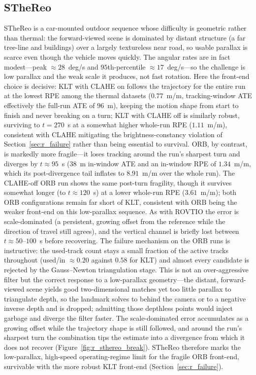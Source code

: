 \subsection{STheReo}
\label{sec:r_sthereo}
STheReo is a car-mounted outdoor sequence whose difficulty is geometric rather than thermal: the forward-viewed scene is dominated by distant structure (a far tree-line and buildings) over a largely textureless near road, so usable parallax is scarce even though the vehicle moves quickly. The angular rates are in fact modest---peak $\approx 28$~deg/s and $95$th-percentile $\approx 17$~deg/s---so the challenge is low parallax and the weak scale it produces, not fast rotation. Here the front-end choice is decisive: KLT with CLAHE on follows the trajectory for the entire run at the lowest RPE among the thermal datasets ($0.77$~m/m, tracking-window ATE effectively the full-run ATE of $96$~m), keeping the motion shape from start to finish and never breaking on a turn; KLT with CLAHE off is similarly robust, surviving to $t=270$~s at a somewhat higher whole-run RPE ($1.11$~m/m), consistent with CLAHE mitigating the brightness-constancy violation of Section~\ref{sec:r_failure} rather than being essential to survival. ORB, by contrast, is markedly more fragile---it loses tracking around the run's sharpest turn and diverges by $t\approx 95$~s ($38$~m in-window ATE and an in-window RPE of $1.34$~m/m, which its post-divergence tail inflates to $8.91$~m/m over the whole run). The CLAHE-off ORB run shows the same post-turn fragility, though it survives somewhat longer (to $t\approx120$~s) at a lower whole-run RPE ($3.61$~m/m); both ORB configurations remain far short of KLT, consistent with ORB being the weaker front-end on this low-parallax sequence. As with ROVTIO the error is scale-dominated (a persistent, growing offset from the reference while the direction of travel still agrees), and the vertical channel is briefly lost between $t\approx 50$--$100$~s before recovering. The failure mechanism on the ORB runs is instructive: the used-track count stays a small fraction of the active tracks throughout (used/in $\approx 0.20$ against $0.58$ for KLT) and almost every candidate is rejected by the Gauss--Newton triangulation stage. This is not an over-aggressive filter but the correct response to a low-parallax geometry---the distant, forward-viewed scene yields good two-dimensional matches yet too little parallax to triangulate depth, so the landmark solves to behind the camera or to a negative inverse depth and is dropped; admitting those depthless points would inject garbage and diverge the filter faster. The scale-dominated error accumulates as a growing offset while the trajectory shape is still followed, and around the run's sharpest turn the combination tips the estimate into a divergence from which it does not recover (Figure~\ref{fig:r_sthereo_break}). STheReo therefore marks the low-parallax, high-speed operating-regime limit for the fragile ORB front-end, survivable with the more robust KLT front-end (Section~\ref{sec:r_failure}).


